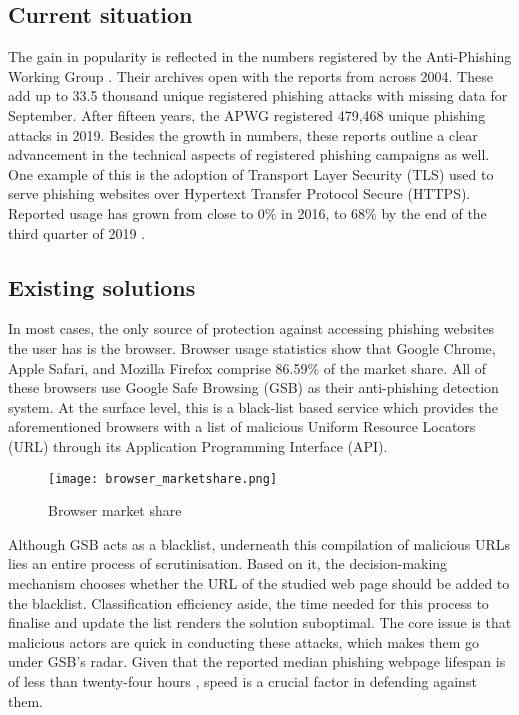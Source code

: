 \subsection{Current situation}
\label{subsec:current_situation}
The gain in popularity is reflected in the numbers registered by the Anti-Phishing Working Group \citep{APWG}. Their archives open with the reports from across 2004. These add up to 33.5 thousand unique registered phishing attacks with missing data for September. After fifteen years, the APWG registered 479,468 unique phishing attacks in 2019. Besides the growth in numbers, these reports outline a clear advancement in the technical aspects of registered phishing campaigns as well. One example of this is the adoption of Transport Layer Security (TLS) used to serve phishing websites over Hypertext Transfer Protocol Secure (HTTPS). Reported usage has grown from close to 0\% in 2016, to 68\% by the end of the third quarter of 2019 \citep{APWG_Q42019}.

\subsection{Existing solutions}
\label{subsec:existing_solutions}
In most cases, the only source of protection against accessing phishing websites
the user has is the browser. Browser usage statistics show that Google
Chrome, Apple Safari, and Mozilla Firefox comprise 86.59\% \citep{Statcounter} of the market share. All of these browsers use Google Safe Browsing (GSB) as their anti-phishing detection system. At the surface level, this is a black-list based service which provides the aforementioned browsers with a list of malicious Uniform Resource Locators (URL) through its
Application Programming Interface (API).

\begin{figure}[t]
	\centering
	\texttt{[image: browser\_marketshare.png]}
	\caption{Browser market share \citep{Statcounter}}
	\label{fig:BROWSER_MARKETSHARE}
\end{figure}

Although GSB acts as a blacklist, underneath this compilation of malicious URLs lies an entire process of scrutinisation. Based on it, the decision-making mechanism chooses whether the URL of the studied web page should be added to the blacklist. Classification efficiency aside, the time needed for this process to finalise and update the list renders the solution suboptimal. The core issue is that malicious actors are quick in conducting these attacks, which makes them go under GSB's radar. Given that the reported median phishing webpage lifespan is of less than twenty-four hours \citep{Kelly_Sheridan}, speed is a crucial factor in defending against them.

